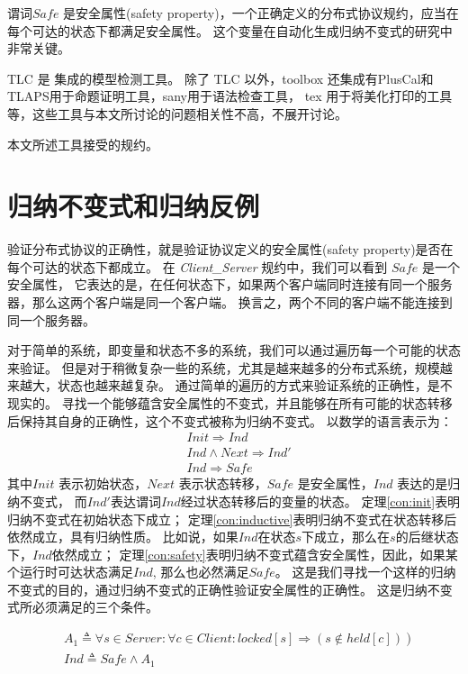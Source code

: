 谓词$Safe$ 是安全属性(safety property)，一个正确定义的分布式协议规约，应当在每个可达的状态下都满足安全属性。
这个变量在自动化生成归纳不变式的研究中非常关键。

TLC 是 \TLA 集成的模型检测工具。
除了 TLC 以外，\TLA toolbox\cite{tla+toolbox} 还集成有PlusCal\cite{PlusCal}和TLAPS用于命题证明工具，sany用于语法检查工具，
tex 用于将\TLA 美化打印的工具等，这些工具与本文所讨论的问题相关性不高，不展开讨论。

本文所述工具接受\TLA 的规约。

\section{归纳不变式和归纳反例}
验证分布式协议的正确性，就是验证协议定义的安全属性(safety property)是否在每个可达的状态下都成立。
在 \textit{Client\_Server} 规约中，我们可以看到 $Safe$ 是一个安全属性，
它表达的是，在任何状态下，如果两个客户端同时连接有同一个服务器，那么这两个客户端是同一个客户端。
换言之，两个不同的客户端不能连接到同一个服务器。

对于简单的系统，即变量和状态不多的系统，我们可以通过遍历每一个可能的状态来验证。
但是对于稍微复杂一些的系统，尤其是越来越多的分布式系统，规模越来越大，状态也越来越复杂。
通过简单的遍历的方式来验证系统的正确性，是不现实的。
寻找一个能够蕴含安全属性的不变式，并且能够在所有可能的状态转移后保持其自身的正确性，这个不变式被称为归纳不变式。
以数学的语言表示为：
\begin{align}
    &Init \Rightarrow Ind \label{con:init}\\
    &Ind \land Next \Rightarrow Ind' \label{con:inductive}\\
    &Ind \Rightarrow Safe \label{con:safety}
\end{align}
其中$Init$ 表示初始状态，$Next$ 表示状态转移，$Safe$ 是安全属性，$Ind$ 表达的是归纳不变式，
而$Ind'$表达谓词$Ind$经过状态转移后的变量的状态。
定理\ref{con:init}表明归纳不变式在初始状态下成立；
定理\ref{con:inductive}表明归纳不变式在状态转移后依然成立，具有归纳性质。
比如说，如果$Ind$在状态$s$下成立，那么在$s$的后继状态下，$Ind$依然成立；
定理\ref{con:safety}表明归纳不变式蕴含安全属性，因此，如果某个运行时可达状态满足$Ind$, 那么也必然满足$Safe$。
这是我们寻找一个这样的归纳不变式的目的，通过归纳不变式的正确性验证安全属性的正确性。
这是归纳不变式所必须满足的三个条件。

\begin{align}
    &\left.A_{1} \triangleq \forall s \in  { Server }: \forall c \in  { Client }:  { locked }[s] \Rightarrow(s \notin { held }[c])\right) \\
    &{ Ind } \triangleq  { Safe } \wedge A_{1} \label{con:candidate_ind}
\end{align}

